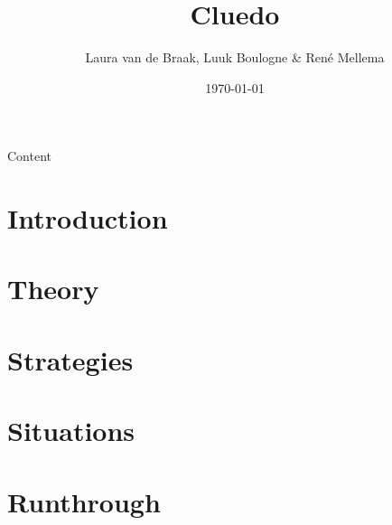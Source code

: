 \documentclass{beamer}
\title{Cluedo}
\author{Laura van de Braak, Luuk Boulogne \& Ren\'e Mellema}
\date{\today}
\begin{document}
\begin{frame}
    \titlepage
\end{frame}

\begin{frame}{Content}
  \tableofcontents
\end{frame}

\section{Introduction}


\section{Theory}


\section{Strategies}


\section{Situations}

\section{Runthrough}

\end{document}

